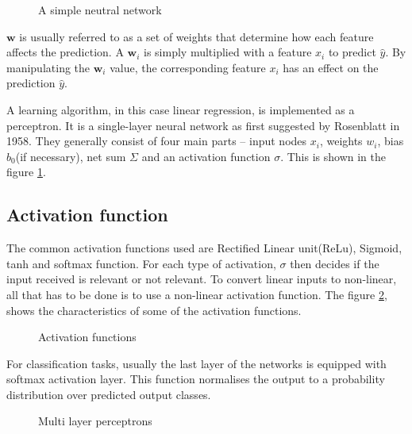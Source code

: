 \begin{figure}
    \centering
        \def\svgwidth{0.55\textwidth}
        
        \caption{A simple neutral network}
        \label{fig:simpleNN}
\end{figure}


$\mathbf{w}$ is usually referred to as a set of weights that determine how each feature
affects the prediction. A $\mathbf{w}_i$ is simply multiplied with a feature $x_i$ to
predict $\hat y$. By manipulating the $\mathbf{w}_i$ value, the corresponding feature $x_i$ has
an effect on the prediction  $\hat y$.

A learning algorithm, in this case linear regression, is implemented as a perceptron. It
is a single-layer neural network as first suggested by Rosenblatt in 1958. They generally consist of four main parts -- input
nodes $x_i$, weights $w_i$, bias $b_0$(if necessary), net sum $\Sigma$ and an activation
function $\sigma$. This is shown in the figure \ref{fig:simpleNN}.

\subsection{Activation function}
\label{subsec:activationfunction}
The common activation functions used are Rectified Linear unit(ReLu), Sigmoid, tanh and
softmax function. For each type of activation, $\sigma$ then decides if the input received is
relevant or not relevant. To convert linear inputs to non-linear, all that has to be done
is to use a non-linear activation function. The figure \ref{fig:activationfunctions},
shows the characteristics of some of the activation functions.

\begin{figure}[h]
	\begin{center}
   \def\svgwidth{1.1\textwidth}
	\end{center}
    \caption{Activation functions}
    \label{fig:activationfunctions}
\end{figure}

For classification tasks, usually the last layer of the networks is equipped with softmax
activation layer. This function normalises the output to a probability distribution over
predicted output classes.

\begin{figure}[h]
    \def\svgwidth{0.7\textwidth}
	\begin{center}
    \end{center}
    \caption{Multi layer perceptrons}
    \label{fig:MLP}
\end{figure}


